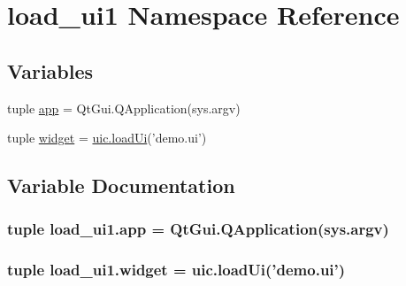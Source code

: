 \hypertarget{namespaceload__ui1}{}\section{load\+\_\+ui1 Namespace Reference}
\label{namespaceload__ui1}
\subsection*{Variables}
\begin{DoxyCompactItemize}
\item 
tuple \hyperlink{namespaceload__ui1_a4fda3683500d13462f31c3373f0f5505}{app} = Qt\+Gui.\+Q\+Application(sys.\+argv)
\item 
tuple \hyperlink{namespaceload__ui1_ae1c0b5083fa05ef1a36db8d821d53f59}{widget} = \hyperlink{namespaceuic_a3444f1dbcbd8cbac324bf5431a34046c}{uic.\+load\+Ui}('demo.\+ui')
\end{DoxyCompactItemize}


\subsection{Variable Documentation}
\hypertarget{namespaceload__ui1_a4fda3683500d13462f31c3373f0f5505}{}
\subsubsection[{app}]{\setlength{\rightskip}{0pt plus 5cm}tuple load\+\_\+ui1.\+app = Qt\+Gui.\+Q\+Application(sys.\+argv)}\label{namespaceload__ui1_a4fda3683500d13462f31c3373f0f5505}
\hypertarget{namespaceload__ui1_ae1c0b5083fa05ef1a36db8d821d53f59}{}
\subsubsection[{widget}]{\setlength{\rightskip}{0pt plus 5cm}tuple load\+\_\+ui1.\+widget = {\bf uic.\+load\+Ui}('demo.\+ui')}\label{namespaceload__ui1_ae1c0b5083fa05ef1a36db8d821d53f59}
